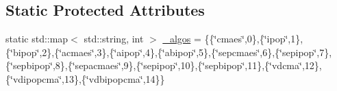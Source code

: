 \subsection*{Static Protected Attributes}
\begin{DoxyCompactItemize}
\item 
static std\+::map$<$ std\+::string, int $>$ \hyperlink{classlibcmaes_1_1Parameters_a5d2fd0ca871efd0f4f4b223515544204}{\+\_\+algos} = \{\{\char`\"{}cmaes\char`\"{},0\},\{\char`\"{}ipop\char`\"{},1\},\{\char`\"{}bipop\char`\"{},2\},\{\char`\"{}acmaes\char`\"{},3\},\{\char`\"{}aipop\char`\"{},4\},\{\char`\"{}abipop\char`\"{},5\},\{\char`\"{}sepcmaes\char`\"{},6\},\{\char`\"{}sepipop\char`\"{},7\},\{\char`\"{}sepbipop\char`\"{},8\},\{\char`\"{}sepacmaes\char`\"{},9\},\{\char`\"{}sepipop\char`\"{},10\},\{\char`\"{}sepbipop\char`\"{},11\},\{\char`\"{}vdcma\char`\"{},12\},\{\char`\"{}vdipopcma\char`\"{},13\},\{\char`\"{}vdbipopcma\char`\"{},14\}\}
\end{DoxyCompactItemize}
